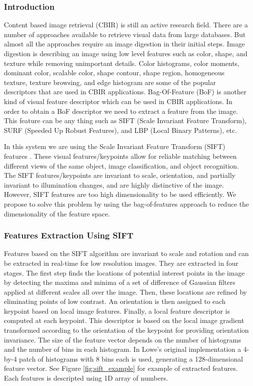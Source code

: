 \subsubsection*{Introduction}
Content based image retrieval (CBIR) is still an active research field. There are a number of approaches available to retrieve visual data from large databases. But almost all the approaches require an image digestion in their initial steps. Image digestion is describing an image using low level features such as color, shape, and texture while removing unimportant details. Color histograms, color moments, dominant color, scalable color, shape contour, shape region, homogeneous texture, texture browsing, and edge histogram are some of the popular descriptors that are used in CBIR applications. Bag-Of-Feature (BoF) is another kind of visual feature descriptor which can be used in CBIR applications. In order to obtain a BoF descriptor we need to extract a feature from the image. This feature can be any thing such as SIFT (Scale Invariant Feature Transform), SURF (Speeded Up Robust Features), and LBP (Local Binary Patterns), etc.\bigskip

In this system we are using the Scale Invariant Feature Transform (SIFT) features \cite{sift}. These visual features/keypoints allow for reliable matching between different views of the same object, image classification, and object recognition. The SIFT features/keypoints are invariant to scale, orientation, and partially invariant to illumination changes, and are highly distinctive of the image. However, SIFT features are too high dimensionality to be used efficiently. We propose to solve this problem by using the bag-of-features approach \cite{Lazebn06} to reduce the
dimensionality of the feature space. \bigskip


\subsubsection{Features Extraction Using SIFT} 
Features based on the SIFT algorithm are invariant to scale and rotation and can be 
extracted in real-time for low resolution images. They are extracted in four stages. The first step 
finds the locations of potential interest points in the image by detecting the maxima and minima 
of a set of difference of Gaussian filters applied at different scales all over the image. Then, these 
locations are refined by eliminating points of low contrast. An orientation is then assigned to 
each keypoint based on local image features. Finally, a local feature descriptor is computed at 
each keypoint. This descriptor is based on the local image gradient transformed according to the 
orientation of the keypoint for providing orientation invariance. The size of the feature vector 
depends on the number of histograms and the number of bins in each histogram. In Lowe's 
original implementation\cite{sift} a 4-by-4 patch of histograms with 8 bins each is used, 
generating a 128-dimensional feature vector. See Figure \ref{fig:sift_example} for example of extracted features. Each features is descripted using 1D array of numbers. 

